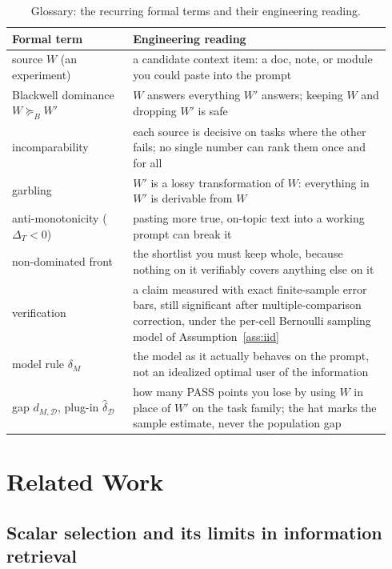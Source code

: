 \documentclass[11pt]{article}
\theoremstyle{plain}
\theoremstyle{definition}
\theoremstyle{remark}
\newcommand{\dhat}{\widehat{\delta}}
\newcommand{\Dcal}{\mathcal{D}}
\newcommand{\Bord}{\succeq_{B}}
\begin{document}
\begin{table}[t]
\centering
\small
\begin{tabular}{@{}p{0.30\linewidth}p{0.64\linewidth}@{}}
\toprule
Formal term & Engineering reading \\
\midrule
source $W$ (an experiment) & a candidate context item: a doc, note, or module you could paste into the prompt \\
Blackwell dominance $W \Bord W'$ & $W$ answers everything $W'$ answers; keeping $W$ and dropping $W'$ is safe \\
incomparability & each source is decisive on tasks where the other fails; no single number can rank them once and for all \\
garbling & $W'$ is a lossy transformation of $W$: everything in $W'$ is derivable from $W$ \\
anti-monotonicity ($\Delta_T<0$) & pasting more true, on-topic text into a working prompt can break it \\
non-dominated front & the shortlist you must keep whole, because nothing on it verifiably covers anything else on it \\
verification & a claim measured with exact finite-sample error bars, still significant after multiple-comparison correction, under the per-cell Bernoulli sampling model of Assumption~\ref{ass:iid} \\
model rule $\delta_M$ & the model as it actually behaves on the prompt, not an idealized optimal user of the information \\
gap $d_{M,\Dcal}$, plug-in $\dhat_{\Dcal}$ & how many PASS points you lose by using $W$ in place of $W'$ on the task family; the hat marks the sample estimate, never the population gap \\
\bottomrule
\end{tabular}
\caption{Glossary: the recurring formal terms and their engineering reading.}
\label{tab:glossary}
\end{table}

\section{Related Work}
\label{sec:related}

\subsection{Scalar selection and its limits in information retrieval}
\label{sec:related-scalar}\label{sec:related-ir}
\end{document}

